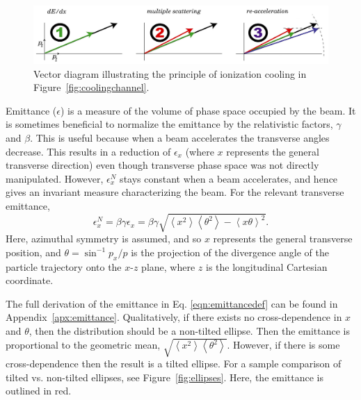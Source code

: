 \begin{figure}
  \centering
   \captionsetup{singlelinecheck=off}
    \includegraphics[width=\textwidth]{Figures/123ionization} 
  \caption{Vector diagram illustrating the principle of ionization cooling in Figure~\ref{fig:coolingchannel}. }
  \label{fig:123ionization}
\end{figure}


\par
Emittance ($\epsilon$) is a measure of the volume of phase space occupied by the beam. It is sometimes beneficial to normalize the emittance by the relativistic factors, $\gamma$ and $\beta$. This is useful because when a beam accelerates the transverse angles decrease. This results in a  reduction of $\epsilon_x$ (where $x$ represents the general transverse direction) even though transverse phase space was not directly manipulated. However, $\epsilon_x ^N$ stays constant when a beam accelerates, and hence gives an invariant measure characterizing the beam. For the relevant transverse emittance,
%
\begin{equation}
\label{eqn:emittancedef}
\epsilon_x^N=\beta\gamma\epsilon_x=\beta\gamma\sqrt{\left<x^2\right>\left<\theta^2\right>-\left<x\theta\right>^2}.
\end{equation}
%
Here, azimuthal symmetry is assumed, and so $x$ represents the general transverse position, and $\theta =\sin^{-1} p_x/p$ is the projection of the divergence angle of the particle trajectory onto the $x$-$z$ plane, where $z$ is the longitudinal Cartesian coordinate. 

The full derivation of the emittance in Eq. \eqref{eqn:emittancedef} can be found in Appendix~\ref{apx:emittance}. Qualitatively, if there exists no cross-dependence in $x$ and $\theta$, then the distribution should be a non-tilted ellipse. Then the emittance is proportional to the geometric mean, $\sqrt{\left<x^2\right>\left<\theta^2\right>}$. However, if there is some cross-dependence then the result is a tilted ellipse. For a sample comparison of tilted vs. non-tilted ellipses, see Figure~\ref{fig:ellipses}. Here, the emittance is outlined in red.

